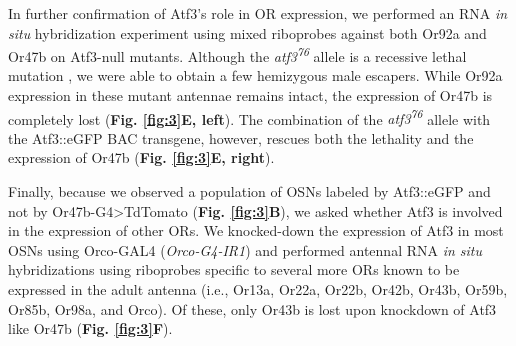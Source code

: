 In further confirmation of Atf3's role in OR expression, we performed an RNA \emph{in situ} hybridization experiment using mixed riboprobes against both Or92a and Or47b on Atf3-null mutants.
Although the \emph{atf3\textsuperscript{76}} allele is a recessive lethal mutation \cite{Brodesser_Jindra_Uhlirova_2012}, we were able to obtain a few hemizygous male escapers.
While Or92a expression in these mutant antennae remains intact, the expression of Or47b is completely lost (\textbf{Fig. \ref{fig:3}E, left}).
The combination of the \emph{atf3\textsuperscript{76}} allele with the Atf3::eGFP BAC transgene, however, rescues both the lethality and the expression of Or47b (\textbf{Fig. \ref{fig:3}E, right}).

Finally, because we observed a population of OSNs labeled by Atf3::eGFP and not by Or47b-G4>TdTomato (\textbf{Fig. \ref{fig:3}B}), we asked whether Atf3 is involved in the expression of other ORs.
We knocked-down the expression of Atf3 in most OSNs using Orco-GAL4 (\emph{Orco-G4-IR1}) and performed antennal RNA \emph{in situ} hybridizations using riboprobes specific to several more ORs known to be expressed in the adult antenna (i.e., Or13a, Or22a, Or22b, Or42b, Or43b, Or59b, Or85b, Or98a, and Orco).
Of these, only Or43b is lost upon knockdown of Atf3 like Or47b (\textbf{Fig. \ref{fig:3}F}).
